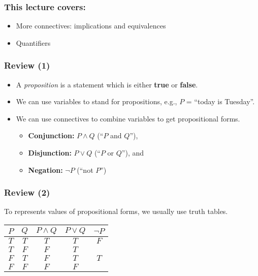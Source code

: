 

\begin{frame}\frametitle{This lecture covers:}
  \begin{itemize}
  \item More connectives: implications and equivalences
  \item Quantifiers
  \end{itemize}
\end{frame}

\begin{frame}\frametitle{Review (1)}
  \begin{itemize}
  \item A {\em proposition} is a statement which is either {\bf true}
    or {\bf false}.
  \item We can use variables to stand for propositions, e.g., $P$ =
    ``today is Tuesday''.
  \item We can use connectives to combine variables to get
    propositional forms.
    \begin{itemize}
    \item {\bf Conjunction:} $P\wedge Q$ (``$P$ and $Q$''), 
    \item {\bf Disjunction:} $P\vee Q$ (``$P$ or $Q$''), and
    \item {\bf Negation:} $\neg P$ (``not $P$'') 
    \end{itemize}
  \end{itemize}
\end{frame}

\begin{frame}\frametitle{Review (2)}
  To represents values of propositional forms, we usually use truth tables.
  \begin{tcolorbox}[title=And/Or/Not]
    \begin{tabular}{|c|c||c|c|c|}
      \hline
      $P$ & $Q$ & $P\wedge Q$ & $P\vee Q$ & $\neg P$ \\
      \hline
      $T$ & $T$ & $T$ & $T$ & $F$ \\
      $T$ & $F$ & $F$ & $T$ & \\
      $F$ & $T$ & $F$ & $T$ & $T$ \\
      $F$ & $F$ & $F$ & $F$ & \\
      \hline
    \end{tabular}
  \end{tcolorbox}
\end{frame}

